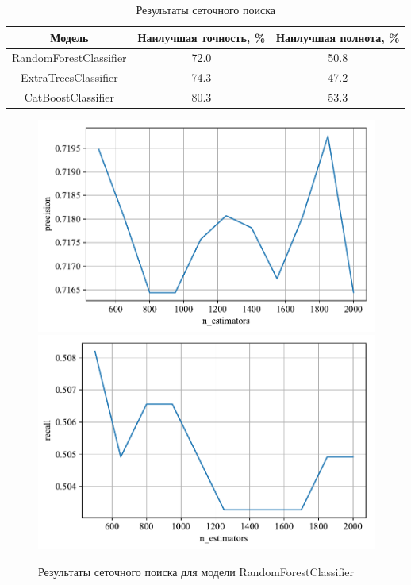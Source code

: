 \begin{table}[h]
    \centering
    \begin{tabular}{|c|c|c|}
        \hline
        Модель & Наилучшая точность, \% & Наилучшая полнота, \% \\
        \hline
        RandomForestClassifier & 72.0 & 50.8 \\
        \hline
        ExtraTreesClassifier & 74.3 & 47.2 \\
        \hline
        CatBoostClassifier & 80.3 & 53.3 \\
        \hline
    \end{tabular}
    \caption{Результаты сеточного поиска}
    \label{tab:toloka_grid_search}
\end{table}

\begin{figure}
    \centering
    \includegraphics{./images/toloka_randomforest_precision.pdf}
    \includegraphics{./images/toloka_randomforest_recall.pdf}
    \caption{Результаты сеточного поиска для модели RandomForestClassifier}
    \label{fig:toloka_randomforest}
\end{figure}

